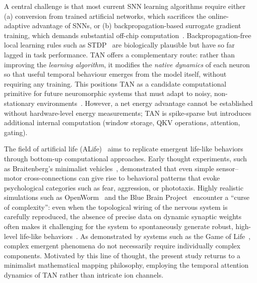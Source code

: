 A central challenge is that most current SNN learning algorithms require either (a) conversion from trained artificial networks, which sacrifices the online-adaptive advantage of SNNs, or (b) backpropagation-based surrogate gradient training, which demands substantial off-chip computation~\cite{eshraghian2021,neftci2019}. Backpropagation-free local learning rules such as STDP~\cite{bi1998} are biologically plausible but have so far lagged in task performance. TAN offers a complementary route: rather than improving the \textit{learning algorithm}, it modifies the \textit{native dynamics} of each neuron so that useful temporal behaviour emerges from the model itself, without requiring any training. This positions TAN as a candidate computational primitive for future neuromorphic systems that must adapt to noisy, non-stationary environments~\cite{roy2019}. However, a net energy advantage cannot be established without hardware-level energy measurements; TAN is spike-sparse but introduces additional internal computation (window storage, QKV operations, attention, gating).

The field of artificial life (ALife)~\cite{langton1995} aims to replicate emergent life-like behaviors through bottom-up computational approaches. Early thought experiments, such as Braitenberg's minimalist vehicles~\cite{braitenberg1984}, demonstrated that even simple sensor--motor cross-connections can give rise to behavioral patterns that evoke psychological categories such as fear, aggression, or phototaxis. Highly realistic simulations such as OpenWorm~\cite{szigeti2014} and the Blue Brain Project~\cite{markram2015} encounter a ``curse of complexity'': even when the topological wiring of the nervous system is carefully reproduced, the absence of precise data on dynamic synaptic weights often makes it challenging for the system to spontaneously generate robust, high-level life-like behaviors~\cite{gjorgjieva2016}. As demonstrated by systems such as the Game of Life~\cite{gardner1970}, complex emergent phenomena do not necessarily require individually complex components. Motivated by this line of thought, the present study returns to a minimalist mathematical mapping philosophy, employing the temporal attention dynamics of TAN rather than intricate ion channels.

